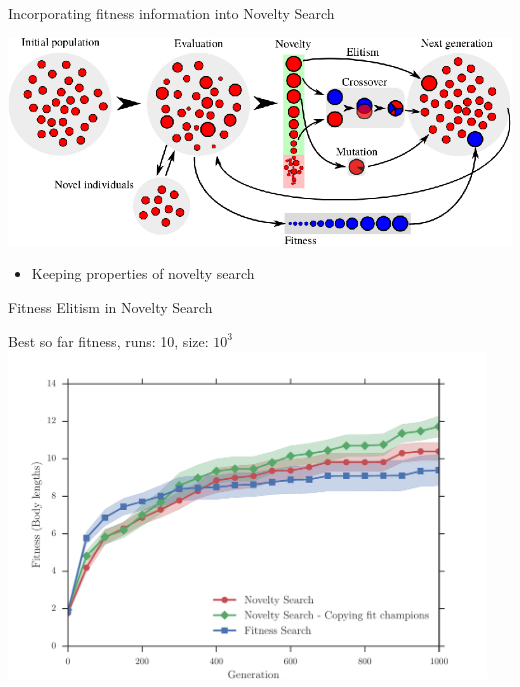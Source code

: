 \documentclass[6pt]{beamer}
\begin{document}
{\begin{frame}{Incorporating fitness information into Novelty Search}
\begin{center}
\includegraphics[width=\textwidth]{../Figures/Misc/EvolutionNoveltyFitnessElitism.eps}
\end{center}
\begin{itemize}
\item Keeping properties of novelty search
\end{itemize}
\end{frame}

\begin{frame}{Fitness Elitism in Novelty Search}
\begin{block}{Best so far fitness, runs: 10, size: $10^3$}
\centering
\includegraphics[width=0.95\textwidth]{../Figures/Results/CopyFitChampions10.pdf}
\end{block}
\end{frame}

}
\end{document}

